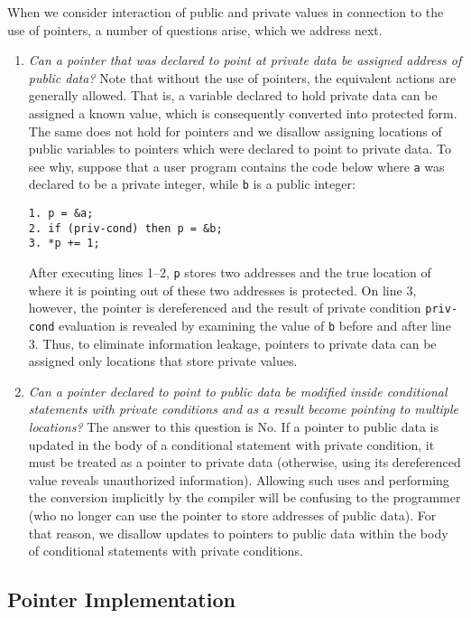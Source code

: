 \documentclass[11pt]{article}
\begin{document}
When we consider interaction of public and private values in connection to
the use of pointers, a number of questions arise, which we address next.
\begin{enumerate}
\item \emph{Can a pointer that was declared to point at private data be
    assigned address of public data?} Note that without the use of pointers,
  the equivalent actions are generally allowed. That is, a variable declared
  to hold private data can be assigned a known value, which is consequently
  converted into protected form. The same does not hold for pointers and we
  disallow assigning locations of public variables to pointers which were
  declared to point to private data. To see why, suppose that a user program
  contains the code below where \texttt{a} was declared to be a private
  integer, while \texttt{b} is a public integer:
  
{\small \begin{verbatim}
1. p = &a;
2. if (priv-cond) then p = &b;
3. *p += 1;
\end{verbatim}}
After executing lines 1--2, \texttt{p} stores two addresses and the
true location of where it is pointing out of these two addresses is
protected. On line 3, however, the pointer is dereferenced and the
result of private condition \texttt{priv-cond} evaluation is revealed
by examining the value of \texttt{b} before and after line 3. Thus, to
eliminate information leakage, pointers to private data can be
assigned only locations that store private values.

\item \emph{Can a pointer declared to point to public data be modified
    inside conditional statements with private conditions and as a result
  become pointing to multiple locations?} The answer to this question is No.
  If a pointer to public data is updated in the body of a conditional
  statement with private condition, it must be treated as a pointer to
  private data (otherwise, using its dereferenced value reveals unauthorized
  information). Allowing such uses and performing the conversion implicitly
  by the compiler will be confusing to the programmer (who no longer can use
  the pointer to store addresses of public data). For that reason, we
  disallow updates to pointers to public data within the body of conditional
  statements with private conditions.
\end{enumerate}

\subsection{Pointer Implementation}
\label{sec:pimpl} 
\end{document}
